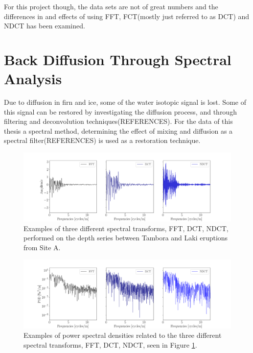 \documentclass[../../CompleteThesis2/Complete_2ndDraft]{subfiles}
\begin{document}
For this project though, the data sets are not of great numbers and the differences in and effects of using FFT, FCT(mostly just referred to as DCT) and NDCT has been examined.


\section[Back Diffusion][Back Diffusion]{Back Diffusion Through Spectral Analysis}
\label{Sec:SignalAnalysis_BackDiffusion}
Due to diffusion in firn and ice, some of the water isotopic signal is lost. Some of this signal can be restored by investigating the diffusion process, and through filtering and deconvolution techniques(REFERENCES).
For the data of this thesis a spectral method, determining the effect of mixing and diffusion as a spectral filter(REFERENCES) is used as a restoration technique. 
	
	
	


\begin{figure}[h]
	\centering
	\includegraphics[width=\textwidth]{SpectralTransforms_3.png}
	\caption[FFT, DCT, NDCT, Site A]{\small Examples of three different spectral transforms, FFT, DCT, NDCT, performed on the depth series between Tambora and Laki eruptions from Site A.}
	\label{fig:SpectralTransforms_3}
\end{figure}

\begin{figure}[h]
	\centering
	\includegraphics[width=\textwidth]{SpectralTransforms_PSD.png}
	\caption[FFT, DCT, NDCT PSDs, Site A]{\small Examples of power spectral densities related to the three different spectral transforms, FFT, DCT, NDCT, seen in Figure \ref{fig:SpectralTransforms_3}.}
	\label{fig:SpectralTransforms_PSD}
\end{figure}
\end{document}
